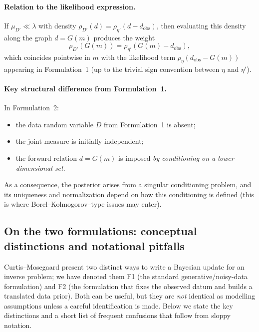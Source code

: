 \documentclass[11pt]{article}
\theoremstyle{remark}
\begin{document}
\paragraph{Relation to the likelihood expression.}
If \(\mu_{D'}\ll\lambda\) with density \(\rho_{D'}(d)=\rho_{\eta'}(d-d_{\mathrm{obs}})\),
then evaluating this density along the graph \(d=G(m)\) produces the weight
\[
\rho_{D'}(G(m))=\rho_{\eta'}(G(m)-d_{\mathrm{obs}}),
\]
which coincides pointwise in \(m\) with the likelihood term
\(\rho_\eta(d_{\mathrm{obs}}-G(m))\) appearing in Formulation~1 (up to the
trivial sign convention between \(\eta\) and \(\eta'\)).

\paragraph{Key structural difference from Formulation~1.}
In Formulation~2:
\begin{itemize}
\item the data random variable \(D\) from Formulation~1 is absent;
\item the joint measure is initially independent;
\item the forward relation \(d=G(m)\) is imposed \emph{by conditioning on a
lower--dimensional set}.
\end{itemize}
As a consequence, the posterior arises from a singular conditioning problem,
and its uniqueness and normalization depend on how this conditioning is
defined (this is where Borel--Kolmogorov--type issues may enter).

\subsection{On the two formulations: conceptual distinctions and notational pitfalls}

Curtis--Mosegaard present two distinct ways to write a Bayesian update for an
inverse problem; we have denoted them F1 (the standard generative/noisy-data
formulation) and F2 (the formulation that fixes the observed datum and builds a
translated data prior).  Both can be useful, but they are \emph{not} identical as
modelling assumptions unless a careful identification is made.  Below we state
the key distinctions and a short list of frequent confusions that follow from
sloppy notation.
\end{document}
